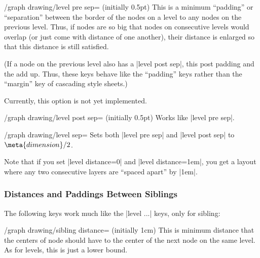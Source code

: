 {\begin{key}{/graph drawing/level pre sep= (initially 0.5pt)}
  This is a minimum ``padding'' or ``separation'' between the border
  of the nodes on a level to any nodes on the previous level. Thus, if
  nodes are so big that nodes on consecutive levels would overlap (or
  just come with  distance of one another), their
  distance is enlarged so that this distance is still satisfied.

  (If a node on the previous level also has a |level post sep|, this
  post padding and the  add up. Thus, these keys
  behave like the ``padding'' keys rather
  than the ``margin'' key of cascading style sheets.)
  
  Currently, this option is not yet implemented.
\end{key}

\begin{key}{/graph drawing/level post sep= (initially 0.5pt)}
  Works like |level pre sep|.
\end{key}

\begin{key}{/graph drawing/level sep=}
  Sets both |level pre sep| and |level post sep| to
  $\meta{dimension}/2$.
\end{key}

Note that if you set |level distance=0| and |level distance=1em|, you get
a layout where any two consecutive layers are ``spaced apart'' by
|1em|.


\subsubsection{Distances and Paddings Between Siblings}

The following keys work much like the |level ...| keys, only for
sibling:

\begin{key}{/graph drawing/sibling distance= (initially 1cm)}
  This is minimum distance that the centers of node should have to the
  center of the next node on the same level. As for levels, this is
  just a lower bound.


\end{key}}
